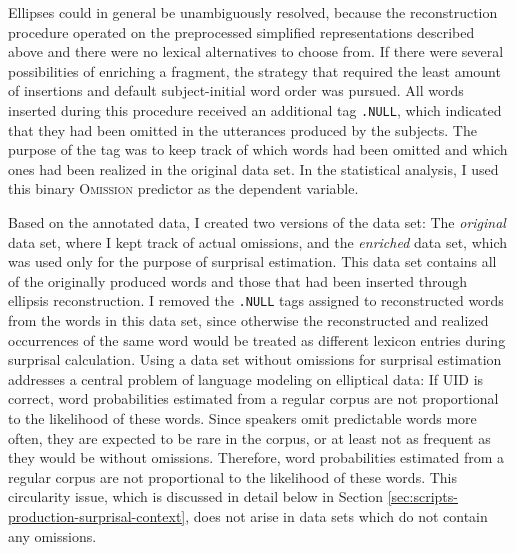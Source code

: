 \begin{sloppypar}
Ellipses could in general be unambiguously resolved, because the reconstruction procedure operated on the preprocessed simplified representations described above and there were no lexical alternatives to choose from. If there were several possibilities of enriching a fragment, the strategy that required the least amount of insertions and default subject-initial word order was pursued. All words inserted during this procedure received an additional tag \texttt{.NULL}, which indicated that they had been omitted in the utterances produced by the subjects. The purpose of the tag was to keep track of which words had been omitted and which ones had been realized in the original data set. In the statistical analysis, I used this binary \textsc{Omission} predictor as the dependent variable.
\end{sloppypar}

Based on the annotated data, I created two versions of the data set: The \textit{original} data set, where I kept track of actual omissions, and the \textit{enriched} data set, which was used only for the purpose of surprisal estimation. This data set contains all of the originally produced words and those that had been inserted through ellipsis reconstruction. I removed the \texttt{.NULL} tags assigned to reconstructed words from the words in this data set, since otherwise the reconstructed and realized occurrences of the same word would be treated as different lexicon entries during surprisal calculation. Using a data set without omissions for surprisal estimation addresses a central problem of language modeling on elliptical data: If UID is correct, word probabilities estimated from a regular corpus are not proportional to the likelihood of these words. Since speakers omit predictable words more often, they are expected to be rare in the corpus, or at least not as frequent as they would be without omissions. Therefore, word probabilities estimated from a regular corpus are not proportional to the likelihood of these words. This circularity issue, which is discussed in detail below in Section \ref{sec:scripts-production-surprisal-context}, does not arise in data sets which do not contain any omissions.

